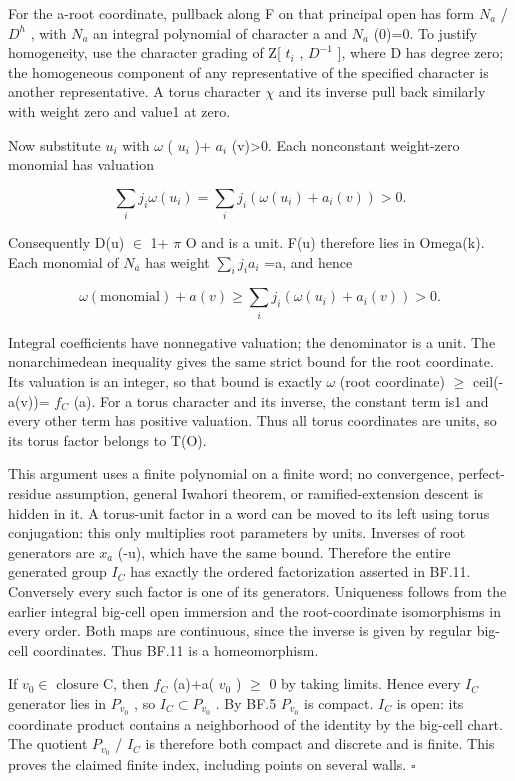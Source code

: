 \documentclass[
  11pt,
]{article}
\begin{document}
For the a-root coordinate, pullback along F on that principal open has
form \(N_{a}\) / \(D^h\) , with \(N_{a}\) an integral polynomial of
character a and \(N_{a}\) (0)=0. To justify homogeneity, use the
character grading of Z{[} \(t_{i}\) , \(D^{-1}\) {]}, where D has degree
zero; the homogeneous component of any representative of the specified
character is another representative. A torus character \(\chi\) and its
inverse pull back similarly with weight zero and value1 at zero.

Now substitute \(u_{i}\) with \(\omega\) ( \(u_{i}\) )+ \(a_{i}\)
(v)\textgreater0. Each nonconstant weight-zero monomial has valuation

\[
 \sum_i j_i\omega(u_i)
 =\sum_i j_i(\omega(u_i)+a_i(v))>0.
\]

Consequently D(u) \(\in\) 1+ \(\pi\) O and is a unit. F(u) therefore
lies in Omega(k). Each monomial of \(N_{a}\) has weight
\(\sum_{i} j_{i} a_{i}\) =a, and hence

\[
 \omega(\text{monomial})+a(v)
 \ge\sum_i j_i(\omega(u_i)+a_i(v))>0.
\]

Integral coefficients have nonnegative valuation; the denominator is a
unit. The nonarchimedean inequality gives the same strict bound for the
root coordinate. Its valuation is an integer, so that bound is exactly
\(\omega\) (root coordinate) \(\ge\) ceil(-a(v))= \(f_{C}\) (a). For a
torus character and its inverse, the constant term is1 and every other
term has positive valuation. Thus all torus coordinates are units, so
its torus factor belongs to T(O).

This argument uses a finite polynomial on a finite word; no convergence,
perfect-residue assumption, general Iwahori theorem, or
ramified-extension descent is hidden in it. A torus-unit factor in a
word can be moved to its left using torus conjugation: this only
multiplies root parameters by units. Inverses of root generators are
\(x_{a}\) (-u), which have the same bound. Therefore the entire
generated group \(I_{C}\) has exactly the ordered factorization asserted
in BF.11. Conversely every such factor is one of its generators.
Uniqueness follows from the earlier integral big-cell open immersion and
the root-coordinate isomorphisms in every order. Both maps are
continuous, since the inverse is given by regular big-cell coordinates.
Thus BF.11 is a homeomorphism.

If \(v_{0} \in\) closure C, then \(f_{C}\) (a)+a( \(v_{0}\) ) \(\ge\) 0
by taking limits. Hence every \(I_{C}\) generator lies in \(P_{v_{0}}\)
, so \(I_{C} \subset P_{v_{0}}\) . By BF.5 \(P_{v_{0}}\) is compact.
\(I_{C}\) is open: its coordinate product contains a neighborhood of the
identity by the big-cell chart. The quotient \(P_{v_{0}}\) / \(I_{C}\)
is therefore both compact and discrete and is finite. This proves the
claimed finite index, including points on several walls. \(\square\)
\end{document}
